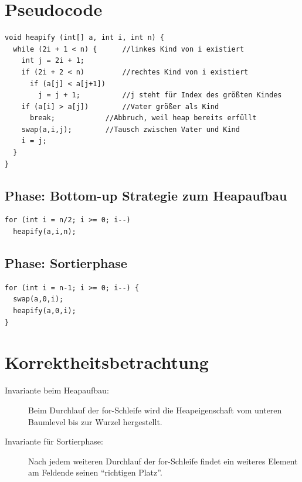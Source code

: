 
\section{Pseudocode}
\begin{lstlisting}[style = pseudo]
void heapify (int[] a, int i, int n) {
  while (2i + 1 < n) {		//linkes Kind von i existiert
    int j = 2i + 1;
    if (2i + 2 < n)  		//rechtes Kind von i existiert
      if (a[j] < a[j+1])
        j = j + 1;  		//j steht für Index des größten Kindes
    if (a[i] > a[j])  		//Vater größer als Kind
      break;  			//Abbruch, weil heap bereits erfüllt
    swap(a,i,j); 		//Tausch zwischen Vater und Kind
    i = j;
  }
}
\end{lstlisting}
\subsection{Phase: Bottom-up Strategie zum Heapaufbau}
\begin{lstlisting}[style = pseudo]
for (int i = n/2; i >= 0; i--)
  heapify(a,i,n);
\end{lstlisting}
\subsection{Phase: Sortierphase}
\begin{lstlisting}[style = pseudo]
for (int i = n-1; i >= 0; i--) {
  swap(a,0,i);
  heapify(a,0,i);
}
\end{lstlisting}
\section{Korrektheitsbetrachtung}
\begin{description}
	\item[Invariante beim Heapaufbau:] Beim Durchlauf der for-Schleife wird die Heapeigenschaft vom unteren Baumlevel bis zur Wurzel hergestellt.
	\item[Invariante für Sortierphase:] Nach jedem weiteren Durchlauf der for-Schleife findet ein weiteres Element am Feldende seinen "`richtigen Platz"'.
\end{description}

